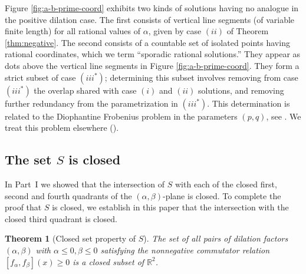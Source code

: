 \documentclass[11pt, letterpaper, reqno]{amsart}
\newtheorem{thm}{Theorem}[section]
\theoremstyle{definition}
\theoremstyle{remark}
\numberwithin{equation}{section}
\newcommand{\RR}{\ensuremath{\mathbb{R}}}
\begin{document}
Figure \ref{fig:a-b-prime-coord} exhibits
two kinds of solutions having no analogue in the
positive dilation case.
The first consists of  vertical line segments 
(of variable finite length) for all rational values of $\alpha$, 
given by case $(ii)$ of Theorem   \ref{thm:negative}. 
The second consists of  a countable set of %
isolated points having rational coordinates, which we term ``sporadic rational solutions.''
They appear as dots above the vertical line segments in Figure \ref{fig:a-b-prime-coord}.
They form  a strict subset of  case $(iii^{\ast})$;
determining this subset involves removing from case $(iii^{\ast})$  
the overlap  shared with case $(i)$ and  $(ii)$  solutions, 
and removing further redundancy from the parametrization in $(iii^*)$.
This determination 
is related to 
the Diophantine Frobenius problem in the parameters $(p,q)$, see \cite{RA05}. 
We treat this problem elsewhere  (\cite{LagR:2019c}).




%
%

\subsection{The set  $S$ is closed} 

In Part~I we showed that the intersection of $S$ with each of the closed first, 
second and fourth quadrants of the $(\alpha, \beta)$-plane is closed. 
To complete the proof  that $S$ is closed, we establish in this paper that the  intersection 
with the  closed third quadrant is closed.

\begin{thm}
[Closed set property of $S$] %
\label{thm:closed}
The set of all pairs of dilation factors $(\alpha, \beta)$ 
with $\alpha \le 0, \beta \le 0$ satisfying  the nonnegative commutator relation 
${[f_\alpha, f_\beta](x) \geq 0 }$
is a closed subset of $\RR^2$.
\end{thm}
\end{document}
